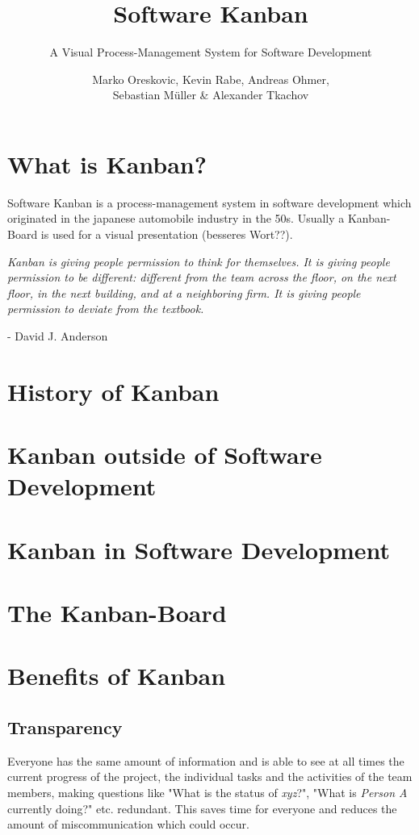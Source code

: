 \documentclass[12pt]{scrartcl}
\title{Software Kanban}
\subtitle{A Visual Process-Management System for Software Development}
\author{Marko Oreskovic, Kevin Rabe, Andreas Ohmer,\\ Sebastian Müller \& Alexander Tkachov}
\date{}
\begin{document}
	\maketitle
		
	\tableofcontents
	\newpage
	
	\section{What is Kanban?}
		Software Kanban is a process-management system in software development which originated in the japanese automobile industry in the 50s. Usually a Kanban-Board is used for a visual {\color{red}presentation (besseres Wort??)}.
		
		\vspace{0.5cm}
		
		\begin{displayquote}
			\textit{Kanban is giving people permission to think for themselves. It is giving people permission to be different: different from the team across the floor, on the next floor, in the next building, and at a neighboring firm. It is giving people permission to deviate from the textbook.} 
		\end{displayquote}
		\hfill - David J. Anderson
	
	\section{History of Kanban}
	
	
	\section{Kanban outside of Software Development}
	
	
	\section{Kanban in Software Development}
	
	
	\section{The Kanban-Board}
	
	\newpage
	
	\section{Benefits of Kanban}
		\subsection{Transparency}
			Everyone has the same amount of information and is able to see at all times the current progress of the project, the individual tasks and the activities of the team members, making questions like "What is the status of \textit{xyz}?", "What is \textit{Person A} currently doing?" etc. redundant. This saves time for everyone and reduces the amount of miscommunication which could occur.
		
\end{document}
